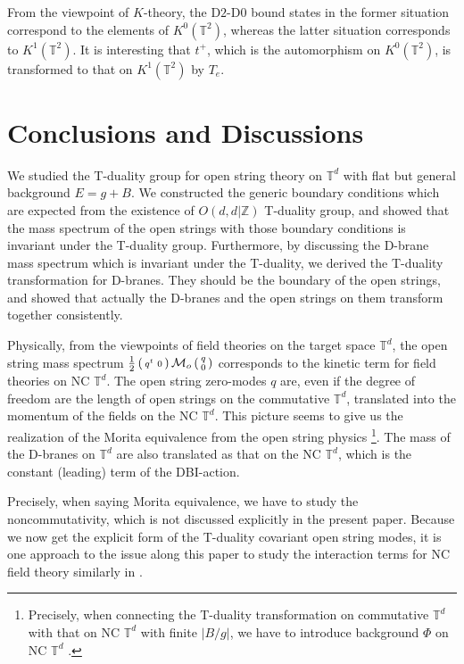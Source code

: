 \documentclass[a4paper,12pt]{article}
\newcommand{\Z}{{\mathbb{Z}}}
\newcommand{\T}{{\mathbb{T}}}
\newcommand{\bps}{\begin{smallmatrix}}
\newcommand{\eps}{\end{smallmatrix}}
\def \half{\frac{1}{2}}
\def \l{{\frak l}}
\def \cM{{\cal M}}
\def \l({\left(}
\def \r){\right)}
\begin{document}
From the viewpoint of $K$-theory, the D$2$-D$0$ bound states in the 
former situation correspond to the elements of $K^0(\T^2)$, whereas 
the latter situation corresponds to $K^1(\T^2)$. 
It is interesting that $t^+$, which is the automorphism on $K^0(\T^2)$, 
is transformed to that on $K^1(\T^2)$ by $T_e$. 




 \section{Conclusions and Discussions}
\label{CD}

We studied the T-duality group for open string theory on $\T^d$ with 
flat but general background $E=g+B$. 
We constructed the generic boundary conditions which are expected from 
the existence of $O(d,d|\Z)$ T-duality group, and 
showed that the mass spectrum of the open strings with 
those boundary conditions is invariant under the T-duality group. 
Furthermore, by discussing the D-brane mass spectrum which is 
invariant under the T-duality, we derived the T-duality transformation 
for D-branes. They should be the boundary of the open strings, 
and showed that actually the D-branes and the open strings on them 
transform together consistently. 




Physically, from the viewpoints of field theories on the target space 
$\T^d$, the open string mass spectrum 
\begin{math} \half \l(\bps q^t & 0\eps\r)\cM_o\l(\bps q\\ 0\eps\r)
\end{math} corresponds to 
the kinetic term for field theories 
on NC $\T^d$. 
The open string zero-modes $q$ are, even if the 
degree of freedom are the length of open strings on the 
commutative $\T^d$, translated into the momentum of the fields on the 
NC $\T^d$. This picture seems to give us the realization 
of the Morita equivalence from the open string physics
\footnote{Precisely, when connecting the T-duality transformation 
on commutative $\T^d$ with that on NC $\T^d$ with finite 
$|B/g|$, we have to introduce background $\Phi$ 
on NC $\T^d$ \cite{S,SW,PS,KS,KMT}. }. 
The mass of the D-branes on $\T^d$ are also translated as 
that on the NC $\T^d$, which is the constant (leading) term 
of the DBI-action.

Precisely, when saying Morita equivalence, 
we have to study the noncommutativity, which is not discussed 
explicitly in the present paper. 
Because we now get the explicit form of 
the T-duality covariant open string modes, 
it is one approach to the issue along this paper 
to study the interaction terms 
for NC field theory similarly in \cite{KO,CK}. 
\end{document}
